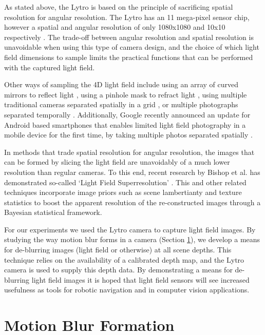 As stated above, the Lytro is based on the principle of sacrificing spatial resolution for angular resolution.
The Lytro has an 11 mega-pixel sensor chip, however a spatial and angular resolution of only 1080x1080 and 10x10 respectively \cite{lytro2014techspecs}.
The trade-off between angular resolution and spatial resolution is unavoidable when using this type of camera design, and the choice of which light field dimensions to sample limits the practical functions that can be performed with the captured light field.

Other ways of sampling the 4D light field include using an array of curved mirrors to reflect light \cite{nayar2004programmable}, using a pinhole mask to refract light \cite{veeraraghavan2007dappled}, using multiple traditional cameras separated spatially in a grid \cite{wilburn2005high}, or multiple photographs separated temporally \cite{levoy1996light}.
Additionally, Google recently announced an update for Android based smartphones that enables limited light field photography in a mobile device for the first time, by taking multiple photos separated spatially \cite{google2014lensblur}.

In methods that trade spatial resolution for angular resolution, the images that can be formed by slicing the light field are unavoidably of a much lower resolution than regular cameras.
To this end, recent research by Bishop et al. has demonstrated so-called \enquote*{Light Field Superresolution} \cite{bishop2009light}.
This and other related techniques incorporate image priors such as scene lambertianty and texture statistics to boost the apparent resolution of the re-constructed images through a Bayesian statistical framework.

For our experiments we used the Lytro camera to capture light field images.
By studying the way motion blur forms in a camera (Section \ref{sec:motion_blur_formation}), we develop a means for de-blurring images (light field or otherwise) at all scene depths.
This technique relies on the availability of a calibrated depth map, and the Lytro camera is used to supply this depth data.
By demonstrating a means for de-blurring light field images it is hoped that light field sensors will see increased usefulness as tools for robotic navigation and in computer vision applications.

\section{Motion Blur Formation}
\label{sec:motion_blur_formation}

